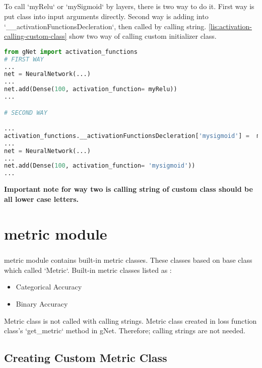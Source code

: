 \documentclass[12pt]{report}
\begin{document}
\paragraph{}
To call `myRelu` or `mySigmoid` by layers, there is two way to do it. First way is put class into input arguments directly. Second way is adding into  `\_\_activationFunctionsDecleration`, then called by calling string. \ref{lis:activation-calling-custom-class} show two way of calling custom initializer class.

\begin{lstlisting}[language=Python, numbers=none,  caption={Calling custom activation function class.}, label={lis:activation-calling-custom-class}]
from gNet import activation_functions
# FIRST WAY
...
net = NeuralNetwork(...)
...
net.add(Dense(100, activation_function= myRelu))
...

# SECOND WAY

...
activation_functions.__activationFunctionsDecleration['mysigmoid'] =  mySigmoid
...
net = NeuralNetwork(...)
...
net.add(Dense(100, activation_function= 'mysigmoid'))
...

\end{lstlisting}

\textbf{Important note for way two is calling string of custom class should be all lower case letters. }





\chapter{metric module}
\label{ch:metric}

\paragraph{}
metric module contains built-in metric classes. These classes based on base class which called `Metric`. Built-in metric classes listed as : 

\begin{itemize}
	\item	Categorical Accuracy
	\item	Binary Accuracy
\end{itemize}

Metric class is not called with calling strings. Metric class created in loss function class's `get\_metric` method in gNet. Therefore; calling strings are not needed. 

\section{Creating Custom Metric Class}
\end{document}
